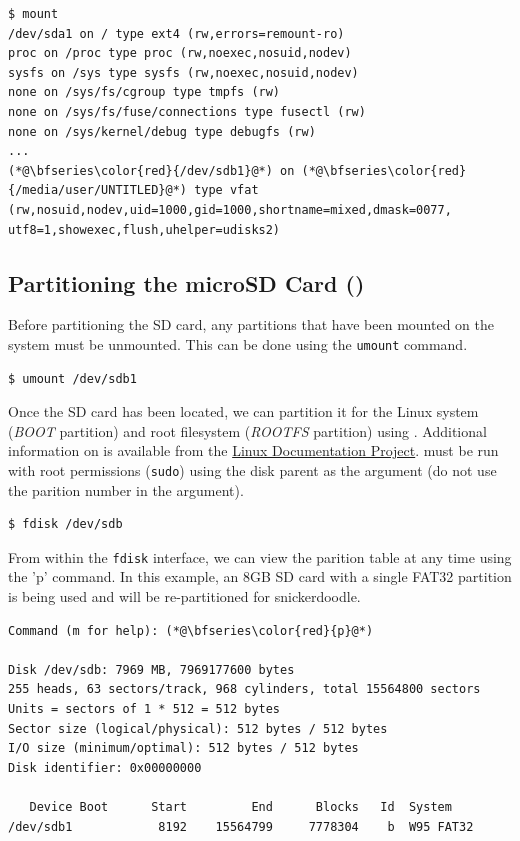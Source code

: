 \begin{lstlisting}[style=text]
$ mount
/dev/sda1 on / type ext4 (rw,errors=remount-ro)
proc on /proc type proc (rw,noexec,nosuid,nodev)
sysfs on /sys type sysfs (rw,noexec,nosuid,nodev)
none on /sys/fs/cgroup type tmpfs (rw)
none on /sys/fs/fuse/connections type fusectl (rw)
none on /sys/kernel/debug type debugfs (rw)
...
(*@\bfseries\color{red}{/dev/sdb1}@*) on (*@\bfseries\color{red}{/media/user/UNTITLED}@*) type vfat (rw,nosuid,nodev,uid=1000,gid=1000,shortname=mixed,dmask=0077, utf8=1,showexec,flush,uhelper=udisks2)
\end{lstlisting}


\subsection{Partitioning the microSD Card ()}
Before partitioning the SD card, any partitions that have been mounted on the system must be unmounted. This can be done using the \texttt{umount} command.


\begin{lstlisting}
$ umount /dev/sdb1
\end{lstlisting}


Once the SD card has been located, we can partition it for the Linux system (\textit{BOOT} partition) and root filesystem (\textit{ROOTFS} partition) using \href{http://linux.die.net/man/8/fdisk}{}. Additional information on  is available from the \href{http://tldp.org/HOWTO/Partition/fdisk_partitioning.html}{Linux Documentation Project}.  must be run with root permissions (\texttt{sudo}) using the disk parent as the argument (do not use the parition number in the argument). 


\begin{lstlisting}[style=text]
$ fdisk /dev/sdb
\end{lstlisting}



From within the \texttt{fdisk} interface, we can view the parition table at any time using the 'p' command. In this example, an 8GB SD card with a single FAT32 partition is being used and will be re-partitioned for snickerdoodle.


\begin{lstlisting}[style=text]
Command (m for help): (*@\bfseries\color{red}{p}@*)

Disk /dev/sdb: 7969 MB, 7969177600 bytes
255 heads, 63 sectors/track, 968 cylinders, total 15564800 sectors
Units = sectors of 1 * 512 = 512 bytes
Sector size (logical/physical): 512 bytes / 512 bytes
I/O size (minimum/optimal): 512 bytes / 512 bytes
Disk identifier: 0x00000000

   Device Boot      Start         End      Blocks   Id  System
/dev/sdb1            8192    15564799     7778304    b  W95 FAT32
\end{lstlisting}


